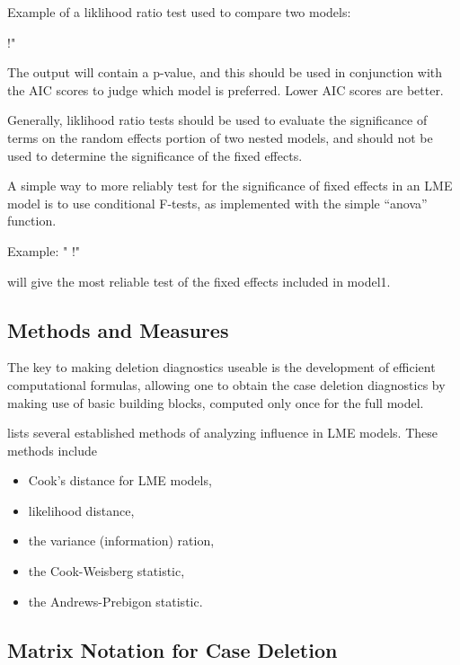 \documentclass[MAIN.tex]{subfiles}
\begin{document}
Example of a liklihood ratio test used to compare two models: 

!"%

The output will contain a p-value, and this should be used in conjunction with the AIC scores to 
judge which model is preferred. Lower AIC scores are better. 

Generally, liklihood ratio tests should be used to evaluate the significance of terms on the 
random effects portion of two nested models, and should not be used to determine the 
significance of the fixed effects. 

A simple way to more reliably test for the significance of fixed effects in an LME model is to use 
conditional F-tests, as implemented with the simple “anova” function. 

Example: 
"
!"%

will give the most reliable test of the fixed effects included in model1. 





\subsection{Methods and Measures}
The key to making deletion diagnostics useable is the development of efficient computational formulas, allowing one to obtain the  case deletion diagnostics by making use of basic building blocks, computed only once for the full model.


\citet{Zewotir} lists several established methods of analyzing influence in LME models. These methods include \begin{itemize}
	\item Cook's distance for LME models,
	\item {} likelihood distance,
	\item the variance (information) ration,
	\item the  Cook-Weisberg statistic,
	\item the  Andrews-Prebigon statistic.
\end{itemize}







\subsection{Matrix Notation for Case Deletion} %
\end{document}

